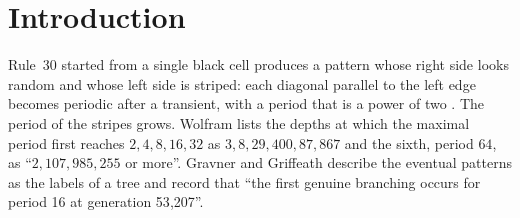\documentclass[11pt]{article}
\theoremstyle{definition}
\theoremstyle{remark}
\begin{document}
\section{Introduction}

Rule~30 started from a single black cell produces a pattern whose right side looks random and whose left side is striped: each diagonal parallel to the left edge becomes periodic after a transient, with a period that is a power of two \cite{GG,Jen86,Rowland}. The period of the stripes grows. Wolfram \cite[p.~871]{NKS} lists the depths at which the maximal period first reaches $2,4,8,16,32$ as $3,8,29,400,87{,}867$ and the sixth, period $64$, as ``$2{,}107{,}985{,}255$ or more''. Gravner and Griffeath \cite[\S8]{GG} describe the eventual patterns as the labels of a tree and record that ``the first genuine branching occurs for period 16 at generation 53{,}207''.
\end{document}
